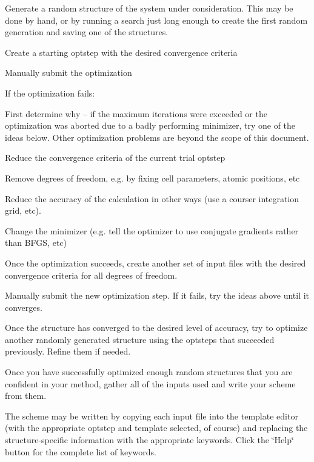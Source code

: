 \begin{DoxyEnumerate}
\item Generate a random structure of the system under consideration. This may be done by hand, or by running a search just long enough to create the first random generation and saving one of the structures.
\item Create a starting optstep with the desired convergence criteria
\item Manually submit the optimization
\item If the optimization fails\-:
\begin{DoxyEnumerate}
\item First determine why -- if the maximum iterations were exceeded or the optimization was aborted due to a badly performing minimizer, try one of the ideas below. Other optimization problems are beyond the scope of this document.
\item Reduce the convergence criteria of the current trial optstep
\item Remove degrees of freedom, e.\-g. by fixing cell parameters, atomic positions, etc
\item Reduce the accuracy of the calculation in other ways (use a courser integration grid, etc).
\item Change the minimizer (e.\-g. tell the optimizer to use conjugate gradients rather than B\-F\-G\-S, etc)
\end{DoxyEnumerate}
\item Once the optimization succeeds, create another set of input files with the desired convergence criteria for all degrees of freedom.
\item Manually submit the new optimization step. If it fails, try the ideas above until it converges.
\item Once the structure has converged to the desired level of accuracy, try to optimize another randomly generated structure using the optsteps that succeeded previously. Refine them if needed.
\item Once you have successfully optimized enough random structures that you are confident in your method, gather all of the inputs used and write your scheme from them.
\end{DoxyEnumerate}

The scheme may be written by copying each input file into the template editor (with the appropriate optstep and template selected, of course) and replacing the structure-\/specific information with the appropriate keywords. Click the \char`\"{}\-Help\char`\"{} button for the complete list of keywords.


